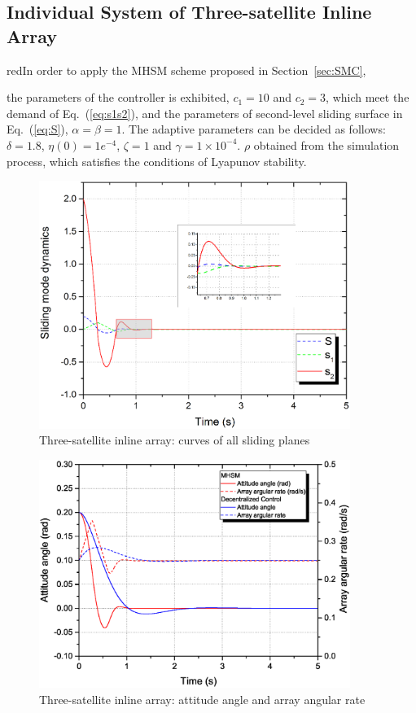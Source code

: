 \subsection{Individual System of Three-satellite Inline Array}
\begin{color}{red}In order to apply the MHSM scheme proposed in Section~\ref{sec:SMC},\end{color} the parameters of the controller is exhibited, $c_1 = 10$ and $c_2 = 3$, which meet the demand of Eq.~(\ref{eq:s1s2}), and the parameters of second-level sliding surface in Eq.~(\ref{eq:S}), $\alpha=\beta=1$. The adaptive parameters can be decided as follows: $\delta = 1.8$, $\eta(0) = 1e^{-4}$, $\zeta = 1$ and $\gamma = 1\times 10^{-4}$. $\rho$ obtained from the simulation process, which satisfies the conditions of Lyapunov stability.\par
\begin{figure}
\centering
\includegraphics[width=0.9\textwidth]{paper2_Fig5.eps}
\caption{Three-satellite inline array: curves of all sliding planes}
\label{Figure:sm}
\end{figure}
\begin{figure}
\centering
\includegraphics[width=0.9\textwidth]{paper2_Fig6.eps}
\caption{Three-satellite inline array: attitude angle and array angular rate}
\label{Figure:attitude}
\end{figure}
